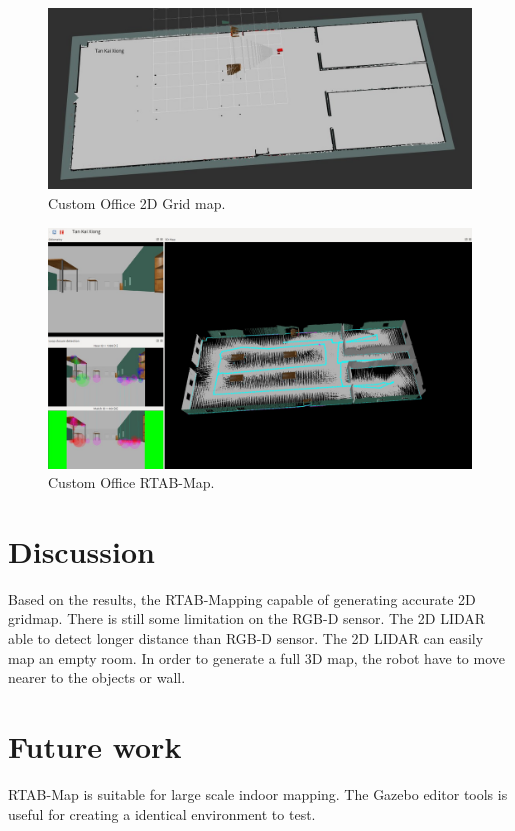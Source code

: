 \documentclass[10pt,journal,compsoc]{IEEEtran}
\begin{document}
\begin{figure}[thpb]
      \centering
      \includegraphics[width=\linewidth]{custom_office_gridmap.png}
      \caption{Custom Office 2D Grid map.}
      \label{fig:robot7}
\end{figure}

\begin{figure}[thpb]
      \centering
      \includegraphics[width=\linewidth]{custom_office_rtabmap.png}
      \caption{Custom Office RTAB-Map.}
      \label{fig:robot8}
\end{figure}

\section{Discussion}
Based on the results, the RTAB-Mapping capable of generating accurate 2D gridmap. There is still some limitation on the RGB-D sensor. The 2D LIDAR able to detect longer distance than RGB-D sensor. The 2D LIDAR can easily map an empty room. In order to generate a full 3D map, the robot have to move nearer to the objects or wall.

\section{Future work}
RTAB-Map is suitable for large scale indoor mapping. The Gazebo editor tools is useful for creating a identical environment to test. 



\end{document}
